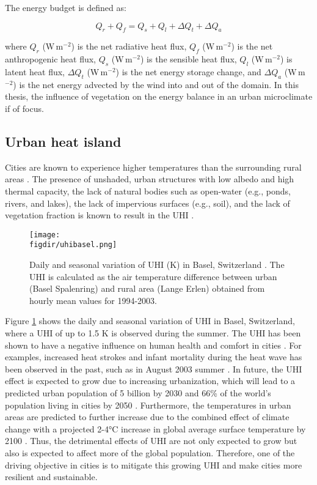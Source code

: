 The energy budget is defined as:

	\begin{equation}
	Q_r + Q_f = Q_s + Q_l + \Delta Q_t + \Delta Q_a
	\end{equation}

where $Q_r$ (W\,m$^{-2}$) is the net radiative heat flux, $Q_f$ (W\,m$^{-2}$) is the net anthropogenic heat flux, $Q_s$ (W\,m$^{-2}$) is the sensible heat flux, $Q_l$ (W\,m$^{-2}$) is latent heat flux, $\Delta Q_t$ (W\,m$^{-2}$) is the net energy storage change, and $\Delta Q_a$ (W\,m$^{-2}$) is the net energy advected by the wind into and out of the domain. In this thesis, the influence of vegetation on the energy balance in an urban microclimate if of focus. 

\subsection{Urban heat island}

Cities are known to experience higher temperatures than the surrounding rural areas \citep{Oke1973,Oke2017a}. The presence of unshaded, urban structures with low albedo and high thermal capacity, the lack of natural bodies such as open-water (e.g., ponds, rivers, and lakes), the lack of impervious surfaces (e.g., soil), and the lack of vegetation fraction is known to result in the UHI \citep{Bowler2010}. 
	
	\begin{figure}[t]
		\centering
		\texttt{[image: \\figdir/uhibasel.png]}
		\caption{Daily and seasonal variation of UHI (K) in Basel, Switzerland \citep{Parlow2014}. The UHI is calculated as the air temperature difference between urban (Basel Spalenring) and rural area (Lange Erlen) obtained from hourly mean values for 1994-2003.}
		\label{fig:uhibasel}
	\end{figure}

Figure \ref{fig:uhibasel} shows the daily and seasonal variation of UHI in Basel, Switzerland, where a UHI of up to 1.5 K is observed during the summer. The UHI has been shown to have a negative influence on human health and comfort in cities \citep{santamouris2001energy,Kovats2008,Salmond2016}. For examples, increased heat strokes and infant mortality during the heat wave has been observed in the past, such as in August 2003 summer \citep{Fouillet2006}. In future, the UHI effect is expected to grow due to increasing urbanization, which will lead to a predicted urban population of 5 billion by 2030 and 66\% of the world’s population living in cities by 2050 \citep{Seto2012, UnitedNations2015}. Furthermore, the temperatures in urban areas are predicted to further increase due to the combined effect of climate change with a projected 2-4\si{\celsius} increase in global average surface temperature by 2100 \citep{pachauri2014climate}. Thus, the detrimental effects of UHI are not only expected to grow but also is expected to affect more of the global population. Therefore, one of the driving objective in cities is to mitigate this growing UHI and make cities more resilient and sustainable. 

